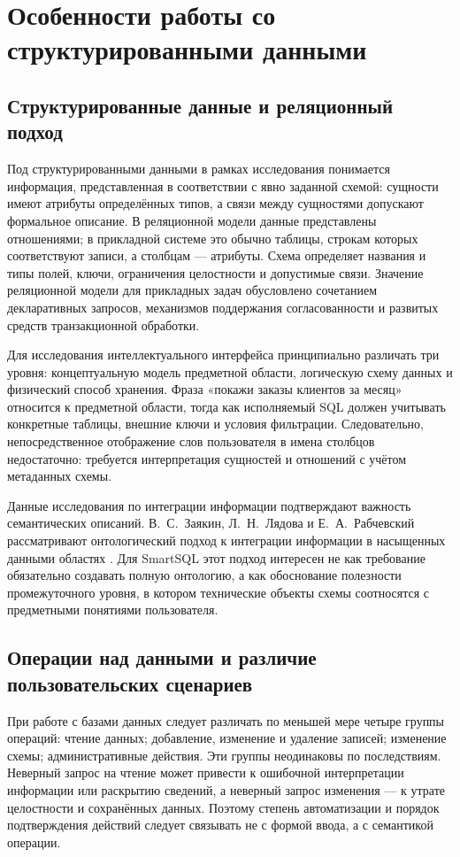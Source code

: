 \clearpage
\section{Особенности работы со структурированными данными}
\subsection{Структурированные данные и реляционный подход}

Под структурированными данными в рамках исследования понимается информация, представленная в соответствии с явно заданной схемой: сущности имеют атрибуты определённых типов, а связи между сущностями допускают формальное описание. В реляционной модели данные представлены отношениями; в прикладной системе это обычно таблицы, строкам которых соответствуют записи, а столбцам — атрибуты. Схема определяет названия и типы полей, ключи, ограничения целостности и допустимые связи. Значение реляционной модели для прикладных задач обусловлено сочетанием декларативных запросов, механизмов поддержания согласованности и развитых средств транзакционной обработки.

Для исследования интеллектуального интерфейса принципиально различать три уровня: концептуальную модель предметной области, логическую схему данных и физический способ хранения. Фраза «покажи заказы клиентов за месяц» относится к предметной области, тогда как исполняемый SQL должен учитывать конкретные таблицы, внешние ключи и условия фильтрации. Следовательно, непосредственное отображение слов пользователя в имена столбцов недостаточно: требуется интерпретация сущностей и отношений с учётом метаданных схемы.

Данные исследования по интеграции информации подтверждают важность семантических описаний. В.~С.~Заякин, Л.~Н.~Лядова и Е.~А.~Рабчевский рассматривают онтологический подход к интеграции информации в насыщенных данными областях \cite{zayakin2022}. Для SmartSQL этот подход интересен не как требование обязательно создавать полную онтологию, а как обоснование полезности промежуточного уровня, в котором технические объекты схемы соотносятся с предметными понятиями пользователя.

\subsection{Операции над данными и различие пользовательских сценариев}

При работе с базами данных следует различать по меньшей мере четыре группы операций: чтение данных; добавление, изменение и удаление записей; изменение схемы; административные действия. Эти группы неодинаковы по последствиям. Неверный запрос на чтение может привести к ошибочной интерпретации информации или раскрытию сведений, а неверный запрос изменения — к утрате целостности и сохранённых данных. Поэтому степень автоматизации и порядок подтверждения действий следует связывать не с формой ввода, а с семантикой операции.

